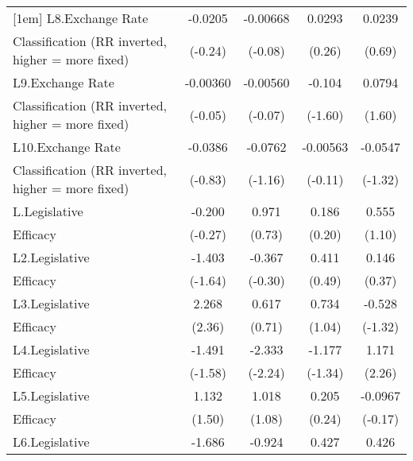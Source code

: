 {\begin{tabular}{l*{4}{c}}
[1em]
L8.Exchange Rate    &     -0.0205         &    -0.00668         &      0.0293         &      0.0239         \\
Classification (RR inverted, higher = more fixed)&     (-0.24)         &     (-0.08)         &      (0.26)         &      (0.69)         \\
[1em]
L9.Exchange Rate    &    -0.00360         &    -0.00560         &      -0.104         &      0.0794         \\
Classification (RR inverted, higher = more fixed)&     (-0.05)         &     (-0.07)         &     (-1.60)         &      (1.60)         \\
[1em]
L10.Exchange Rate   &     -0.0386         &     -0.0762         &    -0.00563         &     -0.0547         \\
Classification (RR inverted, higher = more fixed)&     (-0.83)         &     (-1.16)         &     (-0.11)         &     (-1.32)         \\
[1em]
L.Legislative       &      -0.200         &       0.971         &       0.186         &       0.555         \\
Efficacy            &     (-0.27)         &      (0.73)         &      (0.20)         &      (1.10)         \\
[1em]
L2.Legislative      &      -1.403         &      -0.367         &       0.411         &       0.146         \\
Efficacy            &     (-1.64)         &     (-0.30)         &      (0.49)         &      (0.37)         \\
[1em]
L3.Legislative      &       2.268\sym{*}  &       0.617         &       0.734         &      -0.528         \\
Efficacy            &      (2.36)         &      (0.71)         &      (1.04)         &     (-1.32)         \\
[1em]
L4.Legislative      &      -1.491         &      -2.333\sym{*}  &      -1.177         &       1.171\sym{*}  \\
Efficacy            &     (-1.58)         &     (-2.24)         &     (-1.34)         &      (2.26)         \\
[1em]
L5.Legislative      &       1.132         &       1.018         &       0.205         &     -0.0967         \\
Efficacy            &      (1.50)         &      (1.08)         &      (0.24)         &     (-0.17)         \\
[1em]
L6.Legislative      &      -1.686         &      -0.924         &       0.427         &       0.426         \\

\end{tabular}}
